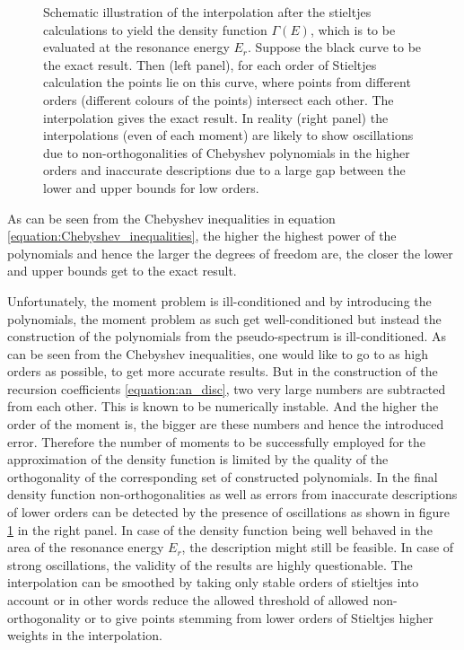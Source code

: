 \begin{figure}[h]
  \centering
  
  \caption{Schematic illustration of the interpolation after the
           stieltjes calculations to yield the density function $\Gamma(E)$,
           which is to be evaluated at the resonance energy $E_r$.
           Suppose the black curve to be the
           exact result. Then (left panel), for each order of Stieltjes calculation
           the points lie on this curve, where points from different orders
           (different colours of the points) intersect each other. The interpolation
           gives the exact result. In reality (right panel) the
           interpolations (even of each moment)
           are likely to show oscillations due to non-orthogonalities of
           Chebyshev polynomials in the higher orders and inaccurate descriptions
           due to a large gap between the lower and upper bounds for low
           orders.}
  \label{figure:stieltjes_density}
\end{figure}

As can be seen from the Chebyshev inequalities in
equation \ref{equation:Chebyshev_inequalities}, the higher the highest
power of the polynomials and hence the larger the degrees of freedom are,
the closer the lower and upper bounds get to the exact result.

Unfortunately, the moment problem is ill-conditioned and by introducing
the polynomials, the moment problem as such get well-conditioned but instead
the construction of the polynomials from the pseudo-spectrum is ill-conditioned.
As can be seen from the Chebyshev inequalities, one would like to go to as
high orders as possible, to get more accurate results. But in the construction
of the recursion coefficients \ref{equation:an_disc}, two very large numbers
are subtracted from each other. This is known to be numerically instable.
And the higher the order of the moment is, the bigger
are these numbers and hence the introduced error. Therefore the number
of moments to be successfully employed for the approximation of the
density function is limited by the quality of the orthogonality of
the corresponding set of constructed polynomials. In the final density function
non-orthogonalities as well as errors from inaccurate descriptions of lower
orders can be detected by the presence of oscillations as shown in
figure \ref{figure:stieltjes_density} in the right panel. In case of the density
function being well behaved in the area of the resonance energy $E_r$, the
description might still be feasible. In case of strong oscillations, the validity
of the results are highly questionable. The interpolation can be smoothed
by taking only stable orders of stieltjes into account or in other words
reduce the allowed threshold of allowed non-orthogonality or to give points
stemming from lower orders of Stieltjes higher weights in the interpolation.
